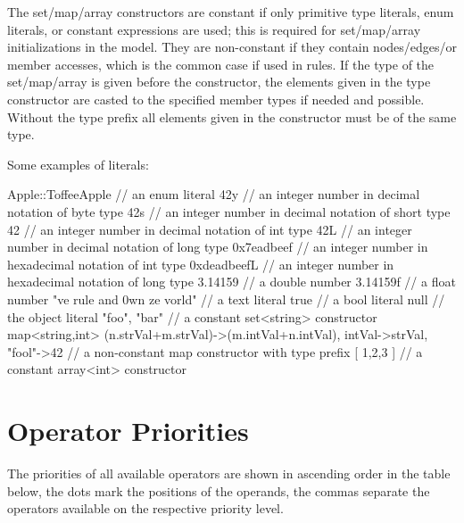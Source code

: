 The set/map/array constructors are constant if only primitive type literals, enum literals, or constant expressions are used; this is required for set/map/array initializations in the model.
They are non-constant if they contain nodes/edges/or member accesses, which is the common case if used in rules.
If the type of the set/map/array is given before the constructor, the elements given in the type constructor are casted to the specified member types if needed and possible.
Without the type prefix all elements given in the constructor must be of the same type.

\begin{example}
Some examples of literals:
\begin{grgen}
Apple::ToffeeApple // an enum literal
42y // an integer number in decimal notation of byte type
42s // an integer number in decimal notation of short type
42 // an integer number in decimal notation of int type
42L // an integer number in decimal notation of long type
0x7eadbeef // an integer number in hexadecimal notation of int type
0xdeadbeefL // an integer number in hexadecimal notation of long type
3.14159 // a double number
3.14159f // a float number
"ve rule and 0wn ze vorld" // a text literal
true // a bool literal
null // the object literal
{ "foo", "bar" } // a constant set<string> constructor
map<string,int>{ (n.strVal+m.strVal)->(m.intVal+n.intVal), intVal->strVal, "fool"->42 } // a non-constant map constructor with type prefix
[ 1,2,3 ] // a constant array<int> constructor
\end{grgen}
\end{example}


\section{Operator Priorities}

The priorities of all available operators are shown in ascending order in the table below, the dots mark the positions of the operands, the commas separate the operators available on the respective priority level.

